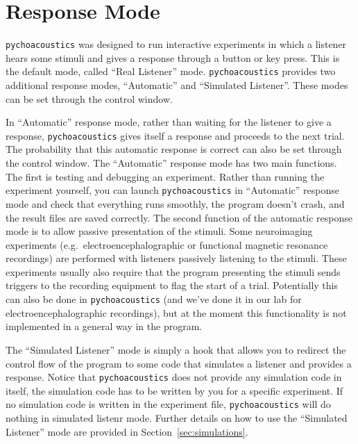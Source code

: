 \section{Response Mode}
\label{sec:response_mode}

\texttt{pychoacoustics} was designed to run interactive experiments in which a listener
hears some stimuli and gives a response through a button or key press. This is the default
mode, called ``Real Listener'' mode. \texttt{pychoacoustics} provides two additional response
modes, ``Automatic'' and ``Simulated Listener''. These modes can be set through the control window.

In ``Automatic'' response mode, rather than waiting for the listener to give a response,
\texttt{pychoacoustics} gives itself a response and proceeds to the next trial. The probability
that this automatic response is correct can also be set through the control window.
The ``Automatic'' response mode has two main functions. The first is testing and debugging
an experiment. Rather than running the experiment yourself, you can launch \texttt{pychoacoustics}
in ``Automatic'' response mode and check that everything runs smoothly, the program doesn't crash,
and the result files are saved correctly. The second function of the automatic response mode is to allow
passive presentation of the stimuli. Some neuroimaging experiments (e.g.\ electroencephalographic or
functional magnetic resonance recordings) are performed with listeners passively listening to the stimuli.
These experiments usually also require that the program presenting the stimuli sends triggers to the
recording equipment to flag the start of a trial. Potentially this can also be done in \texttt{pychoacoustics}
(and we've done it in our lab for electroencephalographic recordings), but at the moment this functionality
is not implemented in a general way in the program.

The ``Simulated Listener'' mode is simply a hook that allows you to redirect the control flow of the program 
to some code that simulates a listener and provides a response. Notice that \texttt{pychoacoustics} does not
provide any simulation code in itself, the simulation code has to be written by you for a specific experiment.
If no simulation code is written in the experiment file, \texttt{pychoacoustics} will do nothing in simulated
listenr mode. Further details on how to use the ``Simulated Listener'' mode are provided in Section~\ref{sec:simulations}.

